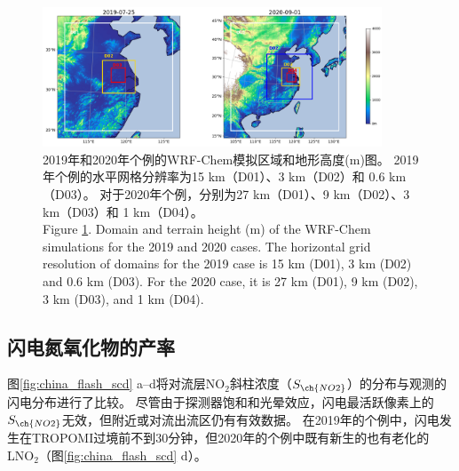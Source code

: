 \begin{figure}[!htbp]
\centering
\includegraphics[width=0.9\textwidth]{./figures/domains_china.png}
\caption{2019年和2020年个例的WRF-Chem模拟区域和地形高度(m)图。
2019年个例的水平网格分辨率为15 km（D01）、3 km（D02）和 0.6 km（D03）。
对于2020年个例，分别为27 km（D01）、9 km（D02）、3 km（D03）和 1 km（D04）。\\
Figure \ref{fig:domains_china}. Domain and terrain height (m) of the WRF-Chem simulations for the 2019 and 2020 cases. The horizontal grid resolution of
domains for the 2019 case is 15 km (D01), 3 km (D02) and 0.6 km (D03). For the 2020 case, it is 27 km (D01), 9 km (D02), 3 km (D03),
and 1 km (D04).}
\label{fig:domains_china}
\end{figure}

\subsection{闪电氮氧化物的产率}

图\ref{fig:china_flash_scd} a--d将对流层NO$_2$斜柱浓度（$S_{\ch{NO2}}$）的分布与观测的闪电分布进行了比较。
尽管由于探测器饱和和光晕效应，闪电最活跃像素上的$S_{\ch{NO2}}$无效，但附近或对流出流区仍有有效数据。
在2019年的个例中，闪电发生在TROPOMI过境前不到30分钟，但2020年的个例中既有新生的也有老化的LNO$_2$（图\ref{fig:china_flash_scd} d）。

